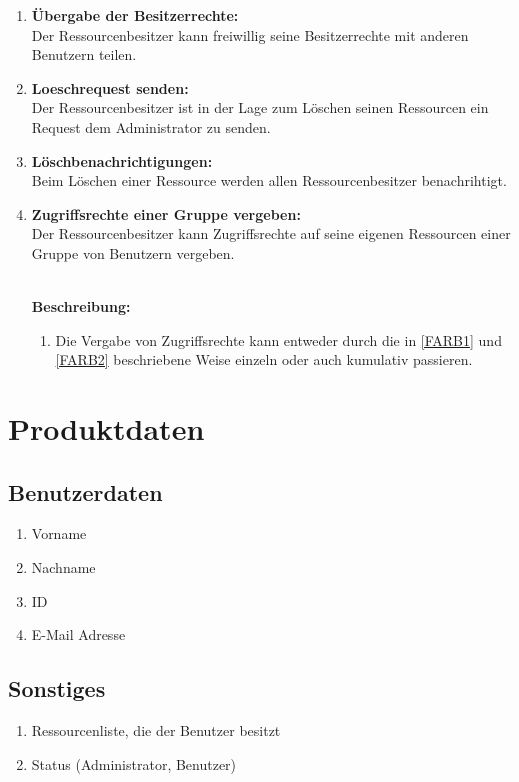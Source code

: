 \documentclass[parskip=full,11pt]{scrartcl}
\def\threedigits#1{%
  \ifnum#1<10 0\fi
  \ifnum#1<1 0\fi
  \number#1}
\begin{document}
\begin{enumerate}[label={\textbf{/F\protect\threedigits{\theenumi}0/}}, leftmargin=*, resume]
\item \label{FARB5} \textbf{Übergabe der Besitzerrechte:}\\
Der Ressourcenbesitzer kann freiwillig seine Besitzerrechte mit anderen Benutzern teilen. 
\item \label{FARB6} \textbf{Loeschrequest senden:}\\
Der Ressourcenbesitzer ist in der Lage zum Löschen seinen Ressourcen ein Request dem Administrator zu senden.
\item \label{FARB7} \colorbox{shadecolor} {\textbf{Löschbenachrichtigungen:}}\\
Beim Löschen einer Ressource werden allen Ressourcenbesitzer benachrihtigt.
\item \label{FARB8} \colorbox{shadecolor} {\textbf{Zugriffsrechte einer Gruppe vergeben:}}\\
Der Ressourcenbesitzer kann Zugriffsrechte auf seine eigenen Ressourcen einer Gruppe von Benutzern vergeben.\\\

\textbf{Beschreibung:}\\
\begin{enumerate}[label=(\arabic*), leftmargin=*]
\item Die Vergabe von Zugriffsrechte kann entweder durch die in \ref{FARB1} und \ref{FARB2} beschriebene Weise einzeln oder auch kumulativ passieren.
\end{enumerate}
\end{enumerate}


\section{Produktdaten}
\subsection{Benutzerdaten}
\begin{enumerate}[label={\textbf{/D\protect\threedigits{\theenumi}0/}}, leftmargin=*]
     		\item Vorname
     		\item Nachname
     		\item ID
     		\item E-Mail Adresse 
\end{enumerate}
     		 
\subsection{Sonstiges}
\begin{enumerate}[label={\textbf{/D\protect\threedigits{\theenumi}0/}}, leftmargin=*, resume]
		\item Ressourcenliste, die der Benutzer besitzt
        	\item Status (Administrator, Benutzer)     
\end{enumerate}
\end{document}
